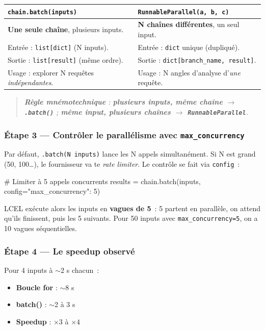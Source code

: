 \documentclass[11pt,a4paper]{article}
\begin{document}
\begin{center}
\begin{tabular}{p{6.5cm} p{6.5cm}}
\toprule
\textbf{\texttt{chain.batch(inputs)}} & \textbf{\texttt{RunnableParallel(a, b, c)}} \\
\midrule
\textbf{Une seule chaîne}, plusieurs inputs.
& \textbf{N chaînes différentes}, un seul input. \\[1mm]
Entrée : \texttt{list[dict]} (N inputs).
& Entrée : \texttt{dict} unique (dupliqué). \\[1mm]
Sortie : \texttt{list[result]} (même ordre).
& Sortie : \texttt{dict[branch\_name, result]}. \\[1mm]
Usage : explorer N requêtes \emph{indépendantes}.
& Usage : N angles d'analyse d'\emph{une} requête. \\
\bottomrule
\end{tabular}
\end{center}

\begin{quote}\itshape\sloppy
\textbf{Règle mnémotechnique} :
\textbf{plusieurs inputs, même chaîne $\to$ \texttt{.batch()}} ;
\textbf{même input, plusieurs chaînes $\to$ \texttt{RunnableParallel}}.
\end{quote}

\subsubsection*{Étape 3 — Contrôler le parallélisme avec \texttt{max\_concurrency}}

Par défaut, \texttt{.batch(N inputs)} lance les N appels simultanément.
Si N est grand (50, 100\dots), le fournisseur va te \emph{rate limiter}.
Le contrôle se fait via \texttt{config}~:

\begin{pythoncode}
# Limiter à 5 appels concurrents
results = chain.batch(inputs, config={"max_concurrency": 5})
\end{pythoncode}

LCEL exécute alors les inputs en \textbf{vagues de 5}~: 5 partent en
parallèle, on attend qu'ils finissent, puis les 5 suivants. Pour 50
inputs avec \texttt{max\_concurrency=5}, on a 10 vagues séquentielles.

\subsubsection*{Étape 4 — Le speedup observé}

Pour 4 inputs à $\sim$2 s chacun~:
\begin{itemize}[leftmargin=*]
  \item \textbf{Boucle for} : $\sim$8 s
  \item \textbf{batch()}    : $\sim$2 à 3 s
  \item \textbf{Speedup}    : $\times 3$ à $\times 4$
\end{itemize}
\end{document}
